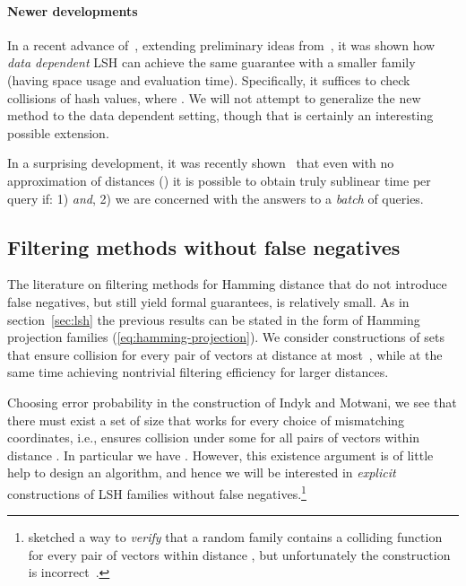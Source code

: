 \documentclass[prodmode,acmtalg]{acmsmall}
\begin{document}
\medskip

\paragraph{Newer developments}
In a recent advance of~\cite{DBLP:conf/stoc/AndoniR15}, extending preliminary ideas from~\cite{andoni2014beyond}, it was shown how \emph{data dependent} LSH can achieve the same guarantee with a smaller family (having  space usage and evaluation time).
Specifically, it suffices to check collisions of  hash values, where .
We will not attempt to generalize the new method to the data dependent setting, though that is certainly an interesting possible extension.

In a surprising development, it was recently shown~\cite{DBLP:conf/focs/AlmanW15} that even with no approximation of distances () it is possible to obtain truly sublinear time per query if: 1)  \emph{and}, 2) we are concerned with the answers to a \emph{batch} of  queries.


\subsection{Filtering methods without false negatives}\label{sec:nofalseneg}

The literature on filtering methods for Hamming distance that do not introduce false negatives, but still yield formal guarantees, is relatively small. 
As in section~\ref{sec:lsh} the previous results can be stated in the form of Hamming projection families (\ref{eq:hamming-projection}).
We consider constructions of sets  that ensure collision for every pair of vectors at distance at most~, while at the same time achieving nontrivial filtering efficiency for larger distances.

Choosing error probability  in the construction of Indyk and Motwani, we see that there must exist a set  of size  that works for every choice of  mismatching coordinates, i.e., ensures collision under some  for all pairs of vectors within distance . In particular we have . However, this existence argument is of little help to design an algorithm, and hence we will be interested in \emph{explicit} constructions of LSH families without false negatives.\footnote{\cite{DBLP:conf/soda/Indyk00} sketched a way to \emph{verify} that a random family contains a colliding function for every pair of vectors within distance , but unfortunately the construction is incorrect~\cite{IndykPersonalCommunication2015}.}
\end{document}
